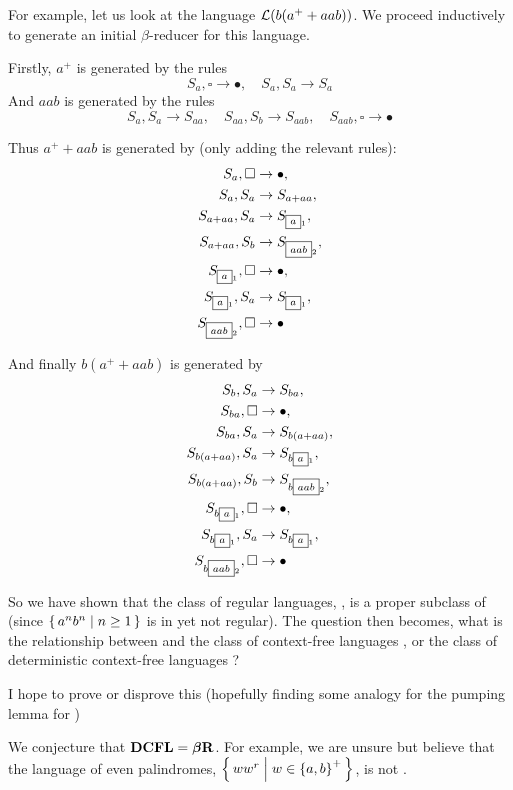 \documentclass{llncs}
\newcommand{\ari}[1]{{\begin{mdframed}[linecolor=blue]{\color{blue}#1}\end{mdframed}}}
\begin{document}
\begin{example}

    For example, let us look at the language $\mathcal{L}(b(a^++aab))$.
    We proceed inductively to generate an initial $\beta$-reducer for this language.
    
    Firstly, $a^+$ is generated by the rules
    \[ S_a,\square\to\bullet,\quad S_a,S_a\to S_a \]
    And $aab$ is generated by the rules
    \[  S_a,S_a \to S_{aa},\quad S_{aa},S_b\to S_{aab},\quad S_{aab},\square\to\bullet \]

    Thus $a^++aab$ is generated by (only adding the relevant rules):
    \begin{align*}
        S_a,\square&\to\bullet,\\
        S_a,S_a&\to S_{a+aa},\\
        S_{a+aa},S_a&\to S_{\mbox a_1},\\
        S_{a+aa},S_b&\to S_{\mbox{aab}_2},\\
        S_{\mbox a_1},\square&\to\bullet,\\
        S_{\mbox a_1},S_a&\to S_{\mbox a_1},\\
        S_{\mbox{aab}_2},\square&\to\bullet
    \end{align*}

    And finally $b(a^++aab)$ is generated by
    \begin{align*}
        S_b,S_a&\to S_{ba},\\
        S_{ba},\square&\to\bullet,\\
        S_{ba},S_a&\to S_{b(a+aa)},\\
        S_{b(a+aa)},S_a&\to S_{b\mbox a_1},\\
        S_{b(a+aa)},S_b&\to S_{b\mbox{aab}_2},\\
        S_{b\mbox a_1},\square&\to\bullet,\\
        S_{b\mbox a_1},S_a&\to S_{b\mbox a_1},\\
        S_{b\mbox{aab}_2},\square&\to\bullet
    \end{align*}

\end{example}

So we have shown that the class of regular languages, \REG, is a proper subclass of \BR{} (since $\set{a^nb^n}[n\geq1]$ is in \BR{} yet not regular).
The question then becomes, what is the relationship between \BR{} and the class of context-free languages \CFL{}, or the class of deterministic context-free languages \DCFL?

\ari{I hope to prove or disprove this (hopefully finding some analogy for the pumping lemma for \BR)}
We conjecture that $\hbox{{\bf DCFL}}=\hbox{{\bf$\boldsymbol{\beta}$R}}$.
For example, we are unsure but believe that the language of even palindromes, $\set{ww^r}[w\in\set{a,b}^+]$, is not \BR.
\end{document}
